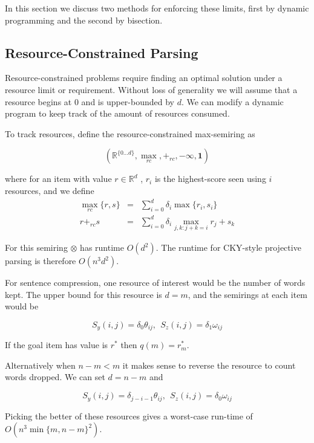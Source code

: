 \documentclass[11pt,a4paper]{article}
\newcommand{\Reals}{\mathbb{R}}
\newcommand{\rtrap}{\scalebox{0.2}{\tikz{
    \coordinate (A) at (0,0);
    \coordinate (B) at (90:1.5cm);
    \coordinate (C) at (2.5,0.9cm);
    \coordinate (D) at (0:2.5cm);
    \draw[line width = 0.05cm] (A)--(B)--(C)--(D)--cycle;
    }}}
\newcommand{\rtri}{\scalebox{0.2}{\tikz{
    \coordinate (A) at (0,0);
    \coordinate (B) at (90:1.5cm);
    \coordinate (C) at (180:-1.7cm);
    \draw[line width = 0.05cm] (A)--(B)--(C)--cycle;
    }}}
\begin{document}
In this section we discuss two methods for enforcing these limits, 
first by dynamic programming and the second by bisection.

\subsection{Resource-Constrained Parsing}

Resource-constrained problems require finding an optimal 
solution under a resource limit or requirement. Without loss
of generality we will assume that a resource begins at $0$ 
and is upper-bounded by $d$. We can modify a dynamic program
to keep track of the amount of resources consumed.

To track resources, define the resource-constrained max-semiring as 

\[(\Reals^{\{0\ldots d\}}, \max_{rc}, +_{rc}, -\mathbf{\infty}, \mathbf{1})\]

\noindent where for an item with value $r \in \Reals^d$ , $r_i$ is the
highest-score seen using $i$ resources, and we define
\begin{eqnarray*}
 \max_{rc} \{r, s\} &=& \sum_{i = 0}^d \delta_i \max \{r_i, s_i\}  \\
 r +_{rc} s &=& \sum_{i = 0}^d \delta_i  \max_{j ,k: j+k =i}  r_j + s_k   
\end{eqnarray*}


For this semiring $\otimes$ has runtime $O(d^2)$. The runtime for CKY-style
projective parsing is therefore $O(n^3d^2)$.


For sentence compression, one resource of interest would be the number of 
words kept. The upper bound for this resource is $d=m$, and the semirings 
at each item would be

\[ S_y(i,j) = \delta_0  \theta_{ij} , \ \  S_z(i,j) = \delta_1 \omega_{ij}  \]

If the goal item has value is $r^*$ then $q(m) = r^*_m$.

Alternatively when $n - m < m$ it makes sense to reverse the resource to 
count words dropped. We can set $d = n - m$ and 

\[S_y(i,j) = \delta_{j-i-1}  \theta_{ij} ,\ \   S_z(i,j) = \delta_0 \omega_{ij}    \]

Picking the better of these resources gives a worst-case run-time of $O(n^3\min\{m,n-m\}^2)$. 

\end{document}

